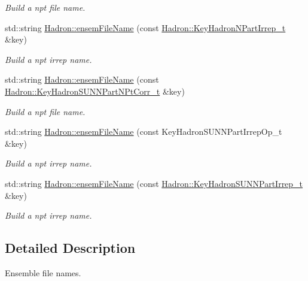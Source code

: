 \begin{DoxyCompactItemize}
\begin{DoxyCompactList}\small\item\em Build a npt file name. \end{DoxyCompactList}\item 
std\+::string \mbox{\hyperlink{namespaceHadron_a21a0c1cea8de6f0c457f10e22cd3d251}{Hadron\+::ensem\+File\+Name}} (const \mbox{\hyperlink{structHadron_1_1KeyHadronNPartIrrep__t}{Hadron\+::\+Key\+Hadron\+N\+Part\+Irrep\+\_\+t}} \&key)
\begin{DoxyCompactList}\small\item\em Build a npt irrep name. \end{DoxyCompactList}\item 
std\+::string \mbox{\hyperlink{namespaceHadron_a535351e28134f75011451a8b7b5f7cb4}{Hadron\+::ensem\+File\+Name}} (const \mbox{\hyperlink{structHadron_1_1KeyHadronSUNNPartNPtCorr__t}{Hadron\+::\+Key\+Hadron\+S\+U\+N\+N\+Part\+N\+Pt\+Corr\+\_\+t}} \&key)
\begin{DoxyCompactList}\small\item\em Build a npt file name. \end{DoxyCompactList}\item 
std\+::string \mbox{\hyperlink{namespaceHadron_abd79d5d930df3781c0e12f1335c4b86e}{Hadron\+::ensem\+File\+Name}} (const Key\+Hadron\+S\+U\+N\+N\+Part\+Irrep\+Op\+\_\+t \&key)
\begin{DoxyCompactList}\small\item\em Build a npt irrep name. \end{DoxyCompactList}\item 
std\+::string \mbox{\hyperlink{namespaceHadron_a45ea107463dbd2ccf4ceae63b851f861}{Hadron\+::ensem\+File\+Name}} (const \mbox{\hyperlink{structHadron_1_1KeyHadronSUNNPartIrrep__t}{Hadron\+::\+Key\+Hadron\+S\+U\+N\+N\+Part\+Irrep\+\_\+t}} \&key)
\begin{DoxyCompactList}\small\item\em Build a npt irrep name. \end{DoxyCompactList}\end{DoxyCompactItemize}


\subsection{Detailed Description}
Ensemble file names. 

